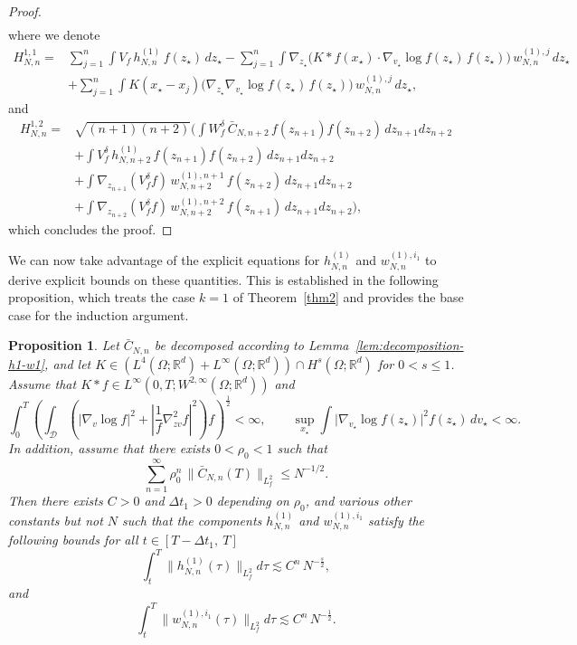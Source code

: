 \documentclass[pdflatex,sn-mathphys-num]{sn-jnl}
\theoremstyle{thmstyleone}%
\newtheorem{proposition}[theorem]{Proposition}%
\theoremstyle{thmstyletwo}%
\theoremstyle{thmstylethree}%
\begin{document}
\begin{proof}
\[\begin{aligned}
\end{aligned}
\]
where we denote
\[
\begin{split}
    H^{1,1}_{N,n}=&\sum_{j=1}^n \int V_f \, h^{(1)}_{N,n} \, f(z_{\star})\,dz_{\star} - \sum_{j=1}^n \int \nabla_{z_{\star}}
\Big( K \ast f(x_{\star}) \cdot \nabla_{v_{\star}} \log f(z_{\star})\, f(z_{\star}) \Big)
\, w^{(1),j}_{N,n}\,dz_{\star}\\
&+ \sum_{j=1}^n \int K(x_{\star}-x_j)
\Big(\nabla_{z_{\star}} \nabla_{v_{\star}} \log f(z_{\star})\, f(z_{\star})\Big)
\, w^{(1),j}_{N,n}\,dz_{\star}, 
\end{split}
\]
and 
\[
\begin{split}
    H^{1,2}_{N,n}=& \sqrt{(n+1)(n+2)} \Bigg( \!\!\int W_f^{\delta}\, \bar{C}_{N,n+2}\,
f(z_{n+1}) f(z_{n+2})\,dz_{n+1}dz_{n+2}\\
&+  \!\!\int V_f^{\delta}\, h^{(1)}_{N,n+2}\,
f(z_{n+1}) f(z_{n+2})\,dz_{n+1}dz_{n+2} \\
&+  \!\!\int \nabla_{z_{n+1}}(V_f^{\delta} f)\,
w_{N,n+2}^{(1),n+1}\, f(z_{n+2})\,dz_{n+1}dz_{n+2}\\
&+  \!\!\int \nabla_{z_{n+2}}(V_f^{\delta} f)\,
w_{N,n+2}^{(1),n+2}\, f(z_{n+1})\,dz_{n+1}dz_{n+2}\Bigg),
\end{split}
\]
which concludes the proof.
\end{proof}
We can now take advantage of the explicit equations for $h^{(1)}_{N,n}$ and $w_{N,n}^{(1),i_1}$ to derive explicit bounds on these quantities. This is established in the following proposition, which treats the case \(k=1\) of Theorem~\ref{thm2} and provides the base case for the induction argument.
\begin{proposition} \label{component_bounds}
Let $\bar C_{N,n}$ be decomposed according to Lemma~\ref{lem:decomposition-h1-w1}, and let \(K \in \left( L^{4}(\Omega;\mathbb{R}^d)+ L^{\infty}(\Omega;\mathbb{R}^d) \right)\cap H^{s}(\Omega;\mathbb{R}^d)\) for \(0 < s \leq 1\). Assume that $K * f \in L^{\infty}\left(0, T; W^{2,\infty}(\Omega; \mathbb{R}^d)\right)$ and
\[\int_{0}^{T} \left( \int_{\mathcal{D}} ( \left|\nabla_{v} \log f \right|^{2} + \left| \frac{1}{f} \nabla^{2}_{zv} f\right|^{2} ) f \right)^{\frac{1}{2}} < \infty,
\qquad
\sup_{x_\star}\int \bigl|\nabla_{v_\star}\log f(z_\star)\bigr|^2 f(z_\star)\,dv_\star
< \infty.
\]
In addition, assume that there exists $0<\rho_0<1$ such that
\[
\sum_{n=1}^\infty \rho_0^n\,\|\bar C_{N,n}(T)\|_{L^2_f}\leq N^{-1/2}.
\]
Then there exists $C>0$ and $\Delta t_1 >0$ depending on {$\rho_0$}, and various other constants but not $N$ such that the components $h^{(1)}_{N,n}$ and $w^{(1),i_1}_{N,n}$ satisfy the following bounds for all $t\in [T-\Delta t_1,\ T]$
\begin{equation}\label{bound:a_Nn}
\int_t^T\| h^{(1)}_{N,n}(\tau)\|_{L^2_f} d\tau \lesssim C^{n}\, N^{-\frac{s}{2}},
\end{equation}
and
\begin{equation}\label{bound:b_Nn}
\int_t^T\| w^{(1),i_1}_{N,n}(\tau)\|_{L^2_f} d\tau \lesssim C^n\, N^{-\frac{1}{2}}.
\end{equation}
\end{proposition}
\end{document}
